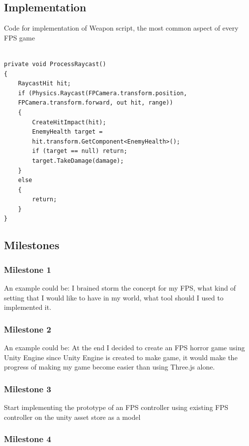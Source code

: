 \documentclass[sigconf]{acmart}
\begin{document}
\subsection{Implementation}
 Code for implementation of Weapon script, the most common aspect of every FPS game
\begin{verbatim}

private void ProcessRaycast()
{
    RaycastHit hit;
    if (Physics.Raycast(FPCamera.transform.position,
    FPCamera.transform.forward, out hit, range))
    {
        CreateHitImpact(hit);
        EnemyHealth target = 
        hit.transform.GetComponent<EnemyHealth>();
        if (target == null) return;
        target.TakeDamage(damage);
    }
    else
    {
        return;
    }
}
\end{verbatim}

\subsection{Milestones}


\subsubsection{Milestone 1}

An example could be: I brained storm the concept for my FPS, what kind of setting that I would like to have in my world, what tool should I used to implemented it. 

\subsubsection{Milestone 2}

An example could be: At the end I decided to create an FPS horror game using Unity Engine since Unity Engine is created to make game, it would make the progress of making my game become easier than using Three.js alone.

\subsubsection{Milestone 3}

Start implementing the prototype of an FPS controller using existing FPS controller on the unity asset store as a model

\subsubsection{Milestone 4}
\end{document}
